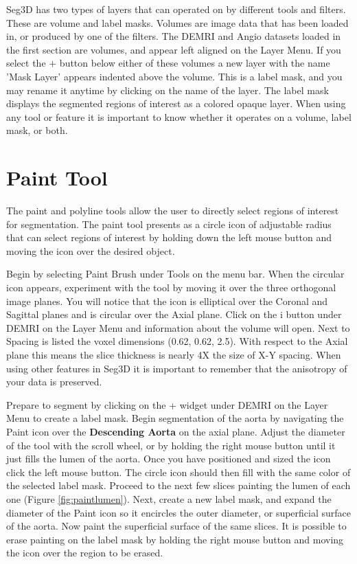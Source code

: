 \documentclass[fleqn,11pt,openany]{book}
\begin{document}
Seg3D has two types of layers that can operated on by different tools and filters.  These are volume and label masks.  Volumes are image data that has been loaded in, or produced by one of the filters.  The DEMRI and Angio datasets loaded in the first section are volumes, and appear left aligned on the Layer Menu.  If you select the $+$ button below either of these volumes a new layer with the name 'Mask Layer' appears indented above the volume.  This is a label mask, and you may rename it anytime by clicking on the name of the layer.  The label mask displays the segmented regions of interest as a colored opaque layer.  When using any tool or feature it is important to know whether it operates on a volume, label mask, or both. 






\section{Paint Tool}

The paint and polyline tools allow the user to directly select regions of interest for segmentation.  The paint tool presents as a circle icon of adjustable radius that can select regions of interest by holding down the left mouse button and moving the icon over the desired object.  

Begin by selecting Paint Brush under Tools on the menu bar.  When the circular icon appears, experiment with the tool by moving it over the three orthogonal image planes.  You will notice that the icon is elliptical over the Coronal and Sagittal planes and is circular over the Axial plane.  Click on the i button under DEMRI on the Layer Menu and information about the volume will open.  Next to Spacing is listed the voxel dimensions (0.62, 0.62, 2.5).  With respect to the Axial plane this means the slice thickness is nearly 4X the size of X-Y spacing.  When using other features in Seg3D it is important to remember that the anisotropy of your data is preserved.

Prepare to segment by clicking on the + widget under DEMRI on the Layer Menu to create a label mask.  Begin segmentation of the aorta by navigating the Paint icon over the {\bf Descending Aorta} on the axial plane.  Adjust the diameter of the tool with the scroll wheel, or by holding the right mouse button until it just fills the lumen of the aorta.  Once you have positioned and sized the icon click the left mouse button.  The circle icon should then fill with the same color of the selected label mask.  Proceed to the next few slices painting the lumen of each one (Figure \ref{fig:paintlumen}).  Next, create a new label mask, and expand the diameter of the Paint icon so it encircles the outer diameter, or superficial surface of the aorta.  Now paint the superficial surface of the same slices.  It is possible to erase painting on the label mask by holding the right mouse button and moving the icon over the region to be erased.
\end{document}
